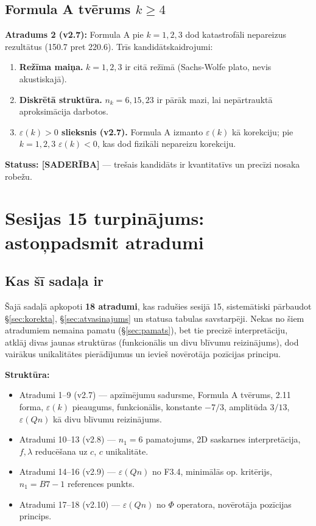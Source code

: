 \documentclass[12pt,a4paper]{article}
\begin{document}
\subsection*{Formula A tvērums $k \geq 4$}

\textbf{Atradums 2 (v2.7):} Formula A pie $k=1,2,3$ dod katastrofāli nepareizus rezultātus (150.7 pret 220.6). Trīs kandidātskaidrojumi:

\begin{enumerate}
    \item \textbf{Režīma maiņa.} $k=1,2,3$ ir citā režīmā (Sachs-Wolfe plato, nevis akustiskajā).
    \item \textbf{Diskrētā struktūra.} $n_k = 6, 15, 23$ ir pārāk mazi, lai nepārtrauktā aproksimācija darbotos.
    \item \textbf{$\varepsilon(k) > 0$ slieksnis (v2.7).} Formula A izmanto $\varepsilon(k)$ kā korekciju; pie $k=1,2,3$ $\varepsilon(k) < 0$, kas dod fizikāli nepareizu korekciju.
\end{enumerate}

\textbf{Statuss: [SADERĪBA]} — trešais kandidāts ir kvantitatīvs un precīzi nosaka robežu.

\newpage

\section{Sesijas 15 turpinājums: astoņpadsmit atradumi}
\label{sec:turpinajums}

\subsection*{Kas šī sadaļa ir}

Šajā sadaļā apkopoti \textbf{18 atradumi}, kas radušies sesijā 15, sistemātiski pārbaudot \S\ref{sec:korekta}, \S\ref{sec:atvasinajums} un statusa tabulas savstarpēji. Nekas no šiem atradumiem nemaina pamatu (\S\ref{sec:pamats}), bet tie precizē interpretāciju, atklāj divas jaunas struktūras (funkcionālis un divu blīvumu reizinājums), dod vairākus unikalitātes pierādījumus un ievieš novērotāja pozīcijas principu.

\textbf{Struktūra:}
\begin{itemize}
    \item Atradumi 1--9 (v2.7) — apzīmējumu sadursme, Formula A tvērums, 2.11 forma, $\varepsilon(k)$ pieaugums, funkcionālis, konstante $-7/3$, amplitūda $3/13$, $\varepsilon(Qn)$ kā divu blīvumu reizinājums.
    \item Atradumi 10--13 (v2.8) — $n_1=6$ pamatojums, 2D saskarnes interpretācija, $f,\lambda$ reducēšana uz $c$, $c$ unikalitāte.
    \item Atradumi 14--16 (v2.9) — $\varepsilon(Qn)$ no F3.4, minimālās op. kritērijs, $n_1=B7-1$ references punkts.
    \item Atradumi 17--18 (v2.10) — $\varepsilon(Qn)$ no $\Phi$ operatora, novērotāja pozīcijas princips.
\end{itemize}
\end{document}
